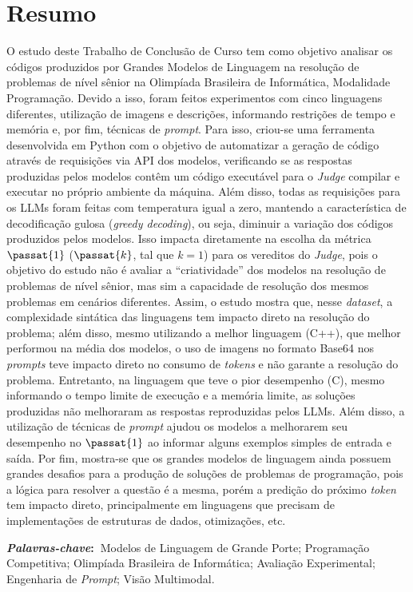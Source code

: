 \chapter*{Resumo}

O estudo deste Trabalho de Conclusão de Curso tem como objetivo analisar os códigos produzidos por Grandes Modelos de Linguagem na resolução de problemas de nível sênior na Olimpíada Brasileira de Informática, Modalidade Programação. Devido a isso, foram feitos experimentos com cinco linguagens diferentes, utilização de imagens e descrições, informando restrições de tempo e memória e, por fim, técnicas de \textit{prompt}.
Para isso, criou-se uma ferramenta desenvolvida em Python com o objetivo de automatizar a geração de código através de requisições via API dos modelos, verificando se as respostas produzidas pelos modelos contêm um código executável para o \textit{Judge} compilar e executar no próprio ambiente da máquina.
Além disso, todas as requisições para os LLMs foram feitas com temperatura igual a zero, mantendo a característica de decodificação gulosa (\textit{greedy decoding}), ou seja, diminuir a variação dos códigos produzidos pelos modelos. Isso impacta diretamente na escolha da métrica $\passat{1}$ ($\passat{k}$, tal que $k = 1$) para os vereditos do \textit{Judge}, pois o objetivo do estudo não é avaliar a ``criatividade'' dos modelos na resolução de problemas de nível sênior, mas sim a capacidade de resolução dos mesmos problemas em cenários diferentes.
Assim, o estudo mostra que, nesse \textit{dataset}, a complexidade sintática das linguagens tem impacto direto na resolução do problema; além disso, mesmo utilizando a melhor linguagem (C++), que melhor performou na média dos modelos, o uso de imagens no formato Base64 nos \textit{prompts} teve impacto direto no consumo de \textit{tokens} e não garante a resolução do problema. Entretanto, na linguagem que teve o pior desempenho (C), mesmo informando o tempo limite de execução e a memória limite, as soluções produzidas não melhoraram as respostas reproduzidas pelos LLMs. Além disso, a utilização de técnicas de \textit{prompt} ajudou os modelos a melhorarem seu desempenho no $\passat{1}$ ao informar alguns exemplos simples de entrada e saída. Por fim, mostra-se que os grandes modelos de linguagem ainda possuem grandes desafios para a produção de soluções de problemas de programação, pois a lógica para resolver a questão é a mesma, porém a predição do próximo \textit{token} tem impacto direto, principalmente em linguagens que precisam de implementações de estruturas de dados, otimizações, etc.

\vspace{5mm}
\noindent\textbf{\textit{Palavras-chave}:~}Modelos de Linguagem de Grande Porte; Programação Competitiva; Olimpíada Brasileira de Informática; Avaliação Experimental; Engenharia de \textit{Prompt}; Visão Multimodal.
